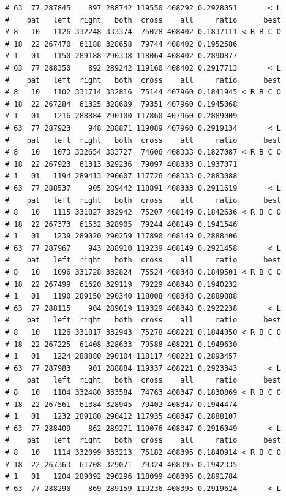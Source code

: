 \documentclass{article}\usepackage[]{graphicx}\usepackage[]{color}
\makeatletter
\newenvironment{kframe}{%
 \def\at@end@of@kframe{}%
 \ifinner\ifhmode%
  \def\at@end@of@kframe{\end{minipage}}%
  \begin{minipage}{\columnwidth}%
 \fi\fi%
 \def\FrameCommand##1{\hskip\@totalleftmargin \hskip-\fboxsep
 \colorbox{shadecolor}{##1}\hskip-\fboxsep
     \hskip-\linewidth \hskip-\@totalleftmargin \hskip\columnwidth}%
 \MakeFramed {\advance\hsize-\width
   \@totalleftmargin\z@ \linewidth\hsize
   \@setminipage}}%
 {\par\unskip\endMakeFramed%
 \at@end@of@kframe}
\newenvironment{knitrout}{}{} %
\makeatother
\begin{document}
\begin{knitrout}
\begin{kframe}
\begin{verbatim}
# 63  77 287845    897 288742 119550 408292 0.2928051       < L
#    pat   left  right   both  cross    all     ratio      best
# 8   10   1126 332248 333374  75028 408402 0.1837111 < R B C O
# 18  22 267470  61188 328658  79744 408402 0.1952586          
# 1   01   1150 289188 290338 118064 408402 0.2890877          
# 63  77 288350    892 289242 119160 408402 0.2917713       < L
#    pat   left  right   both  cross    all     ratio      best
# 8   10   1102 331714 332816  75144 407960 0.1841945 < R B C O
# 18  22 267284  61325 328609  79351 407960 0.1945068          
# 1   01   1216 288884 290100 117860 407960 0.2889009          
# 63  77 287923    948 288871 119089 407960 0.2919134       < L
#    pat   left  right   both  cross    all     ratio      best
# 8   10   1073 332654 333727  74606 408333 0.1827087 < R B C O
# 18  22 267923  61313 329236  79097 408333 0.1937071          
# 1   01   1194 289413 290607 117726 408333 0.2883088          
# 63  77 288537    905 289442 118891 408333 0.2911619       < L
#    pat   left  right   both  cross    all     ratio      best
# 8   10   1115 331827 332942  75207 408149 0.1842636 < R B C O
# 18  22 267373  61532 328905  79244 408149 0.1941546          
# 1   01   1239 289020 290259 117890 408149 0.2888406          
# 63  77 287967    943 288910 119239 408149 0.2921458       < L
#    pat   left  right   both  cross    all     ratio      best
# 8   10   1096 331728 332824  75524 408348 0.1849501 < R B C O
# 18  22 267499  61620 329119  79229 408348 0.1940232          
# 1   01   1190 289150 290340 118008 408348 0.2889888          
# 63  77 288115    904 289019 119329 408348 0.2922238       < L
#    pat   left  right   both  cross    all     ratio      best
# 8   10   1126 331817 332943  75278 408221 0.1844050 < R B C O
# 18  22 267225  61408 328633  79588 408221 0.1949630          
# 1   01   1224 288880 290104 118117 408221 0.2893457          
# 63  77 287983    901 288884 119337 408221 0.2923343       < L
#    pat   left  right   both  cross    all     ratio      best
# 8   10   1104 332480 333584  74763 408347 0.1830869 < R B C O
# 18  22 267561  61384 328945  79402 408347 0.1944474          
# 1   01   1232 289180 290412 117935 408347 0.2888107          
# 63  77 288409    862 289271 119076 408347 0.2916049       < L
#    pat   left  right   both  cross    all     ratio      best
# 8   10   1114 332099 333213  75182 408395 0.1840914 < R B C O
# 18  22 267363  61708 329071  79324 408395 0.1942335          
# 1   01   1204 289092 290296 118099 408395 0.2891784          
# 63  77 288290    869 289159 119236 408395 0.2919624       < L

\end{verbatim}
\end{kframe}
\end{knitrout}
\end{document}
